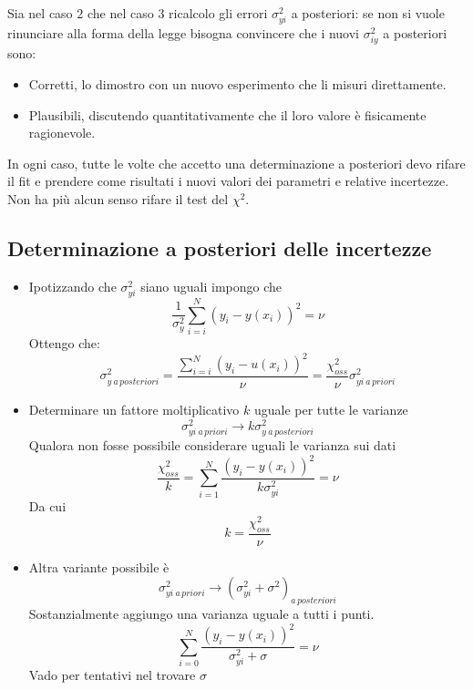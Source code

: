 \documentclass[11pt,a4paper]{book}
\begin{document}
Sia nel caso $ 2 $ che nel caso $ 3 $ ricalcolo gli errori $ \sigma_{yi}^2 $ a posteriori: se non si vuole rinunciare alla forma della legge bisogna convincere che i nuovi $ \sigma_{iy}^2 $ a posteriori sono:
\begin{itemize}
\item Corretti, lo dimostro con un nuovo esperimento che li misuri direttamente.
\item Plausibili, discutendo quantitativamente che il loro valore è fisicamente ragionevole.
\end{itemize}
In ogni caso, tutte le volte che accetto una determinazione a posteriori devo rifare il fit e prendere come risultati i nuovi valori dei parametri e relative incertezze. Non ha più alcun senso rifare il test del $ \chi^2 $.
\subsection{Determinazione a posteriori delle incertezze}  
\begin{itemize}
\item Ipotizzando che $ \sigma_{yi}^2 $ siano uguali impongo che
\begin{equation}
\frac{1}{\sigma_y^2} \sum\limits_{i = i}^{N} (y_i - y(x_i))^2 = \nu
\end{equation}
Ottengo che:
\begin{equation}
\sigma_{y \ a \, posteriori}^2 = \frac{\sum\limits_{i = i}^{N} (y_i - u(x_i))^2}{\nu} = \frac{\chi^2_{oss}}{\nu}\sigma_{yi\ a \, priori}^2
\end{equation}
\item Determinare un fattore moltiplicativo $ k $ uguale per tutte le varianze
\begin{equation}
\sigma_{yi\ a \, priori}^2 \to k \sigma_{y \ a \, posteriori}^2
\end{equation}
Qualora non fosse possibile considerare uguali le varianza sui dati
\begin{equation}
\frac{\chi^2_{oss}}{k} = \sum\limits_{i = 1}^{N} \dfrac{(y_i - y(x_i))^2 }{k \sigma_{yi}^2} = \nu
\end{equation}
Da cui 
\begin{equation}
k = \frac{\chi^2_{oss}}{\nu}
\end{equation}
\item Altra variante possibile è
\begin{equation}
\sigma_{yi\ a \, priori}^2 \to (\sigma_{yi}^2+\sigma^2)_{a \, posteriori}
\end{equation}
Sostanzialmente aggiungo una varianza uguale a tutti i punti.
\begin{equation}
\sum\limits_{i = 0}^{N} \frac{\left( y_i - y(x_i) \right)^2 }{\sigma_{yi}^2+\sigma} = \nu
\end{equation}
Vado per tentativi nel trovare $ \sigma $
\end{itemize}
\end{document}
